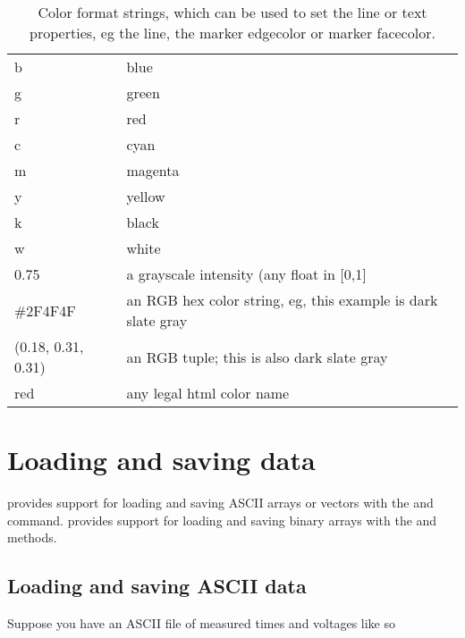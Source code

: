 \documentclass[twoside]{book}
\begin{document}


\begin{table}[htbp]
  \centering
  \begin{tabular}[t]{|l|l|}\hline
      b  & blue\\
      g  & green\\
      r  & red\\
      c  & cyan\\
      m  & magenta\\
      y  & yellow\\
      k  & black\\
      w  & white\\
      0.75  & a grayscale intensity (any float in [0,1]\\
      \#2F4F4F & an RGB hex color string, eg, this example is dark slate
      gray\\
      (0.18, 0.31, 0.31)  & an RGB tuple; this is also dark slate gray\\
      red  & any legal html color name\\\hline
  \end{tabular}
  \caption{\label{tab:color_strings}Color format strings, which can be
      used to set the line or text properties, eg the line, the marker
      edgecolor or marker facecolor.  }
\end{table}

\section{Loading and saving data}
\label{sec:loading_data}

 provides support for loading and saving
ASCII arrays or vectors with the  and  command.
 provides support for loading and saving
binary arrays with the  and  methods.

\subsection{Loading and saving ASCII data}
\label{sec:ascii_data}
Suppose you have an ASCII file of measured times and voltages like so
\end{document}
